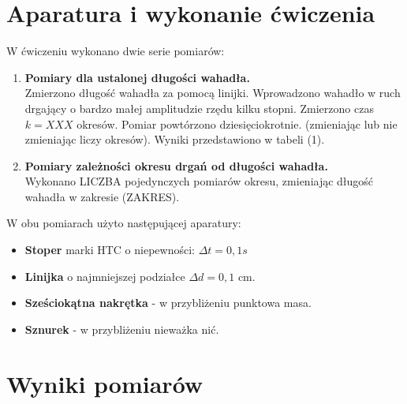 \documentclass{article}
\theoremstyle{plain}
\begin{document}
\section{Aparatura i wykonanie ćwiczenia}
	W ćwiczeniu wykonano dwie serie pomiarów:
	\begin{enumerate}%
		\item \textbf{Pomiary dla ustalonej długości wahadła.}\\
			Zmierzono długość wahadła za pomocą linijki. Wprowadzono wahadło w ruch drgający o bardzo małej amplitudzie rzędu kilku stopni. Zmierzono czas $k= XXX$ okresów. Pomiar powtórzono dziesięciokrotnie. (zmieniając lub nie zmieniając liczy okresów). Wyniki przedstawiono w tabeli (1).
		\item \textbf{Pomiary zależności okresu drgań od długości wahadła.}\\
			Wykonano LICZBA pojedynczych pomiarów okresu, zmieniając długość wahadła w zakresie (ZAKRES).
	\end{enumerate}
	W obu pomiarach użyto następującej aparatury:
	\begin{itemize} %
		\item \textbf{Stoper} marki HTC o niepewności: $\Delta t = 0,1s$
		\item \textbf{Linijka} o najmniejszej podziałce $\Delta d = 0,1$ cm.
		\item \textbf{Sześciokątna nakrętka} - w przybliżeniu punktowa masa.
		\item \textbf{Sznurek} - w przybliżeniu nieważka nić. %
	\end{itemize}
	
\newpage

\section{Wyniki pomiarów}
\end{document}

